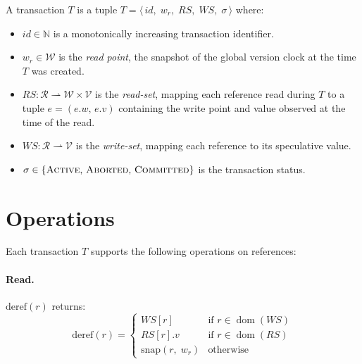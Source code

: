 \begin{definition}[Transaction]
  A transaction $T$ is a tuple
  $T = \langle\, id,\; w_r,\; RS,\; WS,\; \sigma \,\rangle$ where:
  \begin{itemize}
    \item $id \in \mathbb{N}$ is a monotonically increasing transaction
          identifier.
    \item $w_r \in \mathcal{W}$ is the \emph{read point}, the snapshot of the
          global version clock at the time $T$ was created.
    \item $RS : \mathcal{R} \rightharpoonup \mathcal{W} \times \mathcal{V}$ is
          the \emph{read-set}, mapping each reference read during $T$ to a
          tuple $e = (e.w,\, e.v)$ containing the write point and value
          observed at the time of the read.
    \item $WS : \mathcal{R} \rightharpoonup \mathcal{V}$ is the \emph{write-set},
          mapping each reference to its speculative value.
    \item $\sigma \in \{\textsc{Active},\, \textsc{Aborted},\,
            \textsc{Committed}\}$ is the transaction status.
  \end{itemize}
\end{definition}

\section{Operations}

Each transaction $T$ supports the following operations on references:

\paragraph{Read.} $\text{deref}(r)$ returns:
\[
  \text{deref}(r) =
  \begin{cases}
    WS[r]                 & \text{if } r \in \operatorname{dom}(WS) \\
    RS[r].v               & \text{if } r \in \operatorname{dom}(RS) \\
    \text{snap}(r,\; w_r) & \text{otherwise}
  \end{cases}
\]

